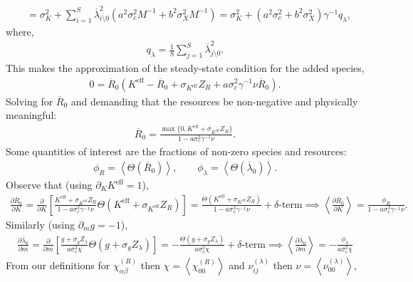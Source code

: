 \documentclass[10pt]{article}
\newcommand{\1}{\mathbf 1}
\newcommand{\ip}[1]{\left< #1 \right>}
\begin{document}
{\begin{align}
	\\
	&=
	\sigma_K^2
	+
	\sum_{i=1}^S \overline{\lambda}_{i\setminus 0}^2(
	a^2 \sigma_c^2 
	M^{-1}
	+
	b^2 \sigma_X^2
	M^{-1}
	)
	=
	\sigma_K^2 + (a^2 \sigma_c^2 + b^2 \sigma_X^2) \gamma^{-1} q_\lambda,
\end{align}
where,
\begin{align}
	q_\lambda
	=
	\frac{1}{S}
	\sum_{j = 1}^S \overline{\lambda}_{j\setminus 0}^2.
\end{align}
This makes the approximation of the steady-state condition for the added species,
\begin{align}
	0 =\overline{R}_0 
	(
		K^\text{eff} - \overline{R}_0 + \sigma_{K^\text{eff}} Z_R
		+
		a \sigma_c^2 \gamma^{-1} \nu \overline{R}_0
	).
\end{align}
Solving for $\overline{R}_0$ and demanding that the resources be non-negative and physically meaningful:
\begin{align}
	\overline{R}_0
	=
	\frac{\max\{0,K^\text{eff} + \sigma_{K^\text{eff}} Z_R\}}{1 - a \sigma_c^2 \gamma^{-1} \nu }.
	\label{newResourceFinal}
\end{align}
Some quantities of interest are the fractions of non-zero species and resources:
\begin{align}
	\phi_R
	=
	\ip{
		\Theta(\overline{R}_0)
	}
	,
	\qquad
	\phi_\lambda
	=
	\ip{
		\Theta(\overline{\lambda}_0)
	}.
\end{align}
Observe that (using $\partial_K K^\text{eff} = 1$),
\begin{align}
	\frac{\partial \overline{R}_0}{\partial K}
	=
	\frac{\partial}{\partial K}
	\left[
	\frac{K^\text{eff} + \sigma_{K^\text{eff}} Z_R }{1-a\sigma_c^2 \gamma^{-1} \nu}\Theta(K^\text{eff} + \sigma_{K^\text{eff}} Z_R)\right]
	=
	\frac{\Theta(K^\text{eff} + \sigma_{K^\text{eff}} Z_R) }{1-a\sigma_c^2 \gamma^{-1}\nu}
	+
	\text{$\delta$-term}
	\implies
	\ip{
	\frac{\partial \overline{R}_0}{\partial K}
	}
	=
	\frac{\phi_R}{1-a\sigma_c^2 \gamma^{-1}\nu}.
\end{align}
Similarly (using $\partial_m g = -1$),
\begin{align}
	\frac{\partial \overline{\lambda}_0}{\partial m}
	=
	\frac{\partial}{\partial m}
	\left[
		\frac{g+\sigma_g Z_\lambda}{a \sigma_c^2 \chi}
		\Theta(g + \sigma_g Z_\lambda)
	\right]
	=
	-\frac{\Theta(g + \sigma_g Z_\lambda)}{a\sigma_c^2 \chi}
	+
	\text{$\delta$-term}
	\implies
	\ip{
	\frac{\partial \overline{\lambda}_0}{\partial m}
	}
	=
	-\frac{\phi_\lambda}{a\sigma_c^2 \chi}
\end{align}
From our definitions for $\chi^{(R)}_{\alpha\beta}$ then $\chi  = \ip{\chi_{00}^{(R)}}$ and $\nu^{(\lambda)}_{ij}$ then $\nu = \ip{\nu_{00}^{(\lambda)}}$,
}
\end{document}
